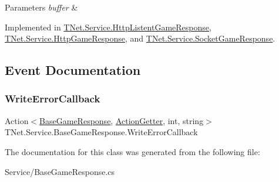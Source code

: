 \begin{DoxyParams}{Parameters}
{\em buffer} & \\
\hline
\end{DoxyParams}


Implemented in \mbox{\hyperlink{class_t_net_1_1_service_1_1_http_listent_game_response_ae8d535287fff26bbf1face8058daec22}{T\+Net.\+Service.\+Http\+Listent\+Game\+Response}}, \mbox{\hyperlink{class_t_net_1_1_service_1_1_http_game_response_adab6896df13148c3b3e5e61cd98649e9}{T\+Net.\+Service.\+Http\+Game\+Response}}, and \mbox{\hyperlink{class_t_net_1_1_service_1_1_socket_game_response_a0c3fe7867f34f833a10958c230197f20}{T\+Net.\+Service.\+Socket\+Game\+Response}}.



\subsection{Event Documentation}
\mbox{\label{class_t_net_1_1_service_1_1_base_game_response_a9a7dc8163510f5349af133a98fce8c9c}} 
\subsubsection{\texorpdfstring{Write\+Error\+Callback}{WriteErrorCallback}}
{\footnotesize\ttfamily Action$<$\mbox{\hyperlink{class_t_net_1_1_service_1_1_base_game_response}{Base\+Game\+Response}}, \mbox{\hyperlink{class_t_net_1_1_service_1_1_action_getter}{Action\+Getter}}, int, string$>$ T\+Net.\+Service.\+Base\+Game\+Response.\+Write\+Error\+Callback}







The documentation for this class was generated from the following file\+:\begin{DoxyCompactItemize}
\item 
Service/Base\+Game\+Response.\+cs\end{DoxyCompactItemize}
